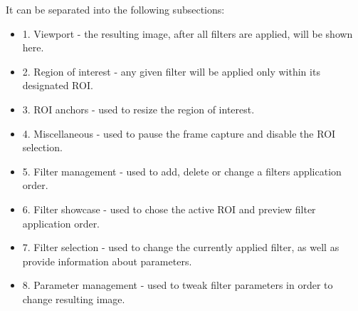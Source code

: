 It can be separated into the following subsections:
\begin{itemize}
	\item 1. Viewport - the resulting image, after all filters are applied, will be shown here.
	\item 2. Region of interest - any given filter will be applied only within its designated ROI.
	\item 3. ROI anchors - used to resize the region of interest.
	\item 4. Miscellaneous - used to pause the frame capture and disable the ROI selection.
	\item 5. Filter management - used to add, delete or change a filters application order.
	\item 6. Filter showcase - used to chose the active ROI and preview filter application order.
	\item 7. Filter selection - used to change the currently applied filter, as well as provide
	      information about parameters.
	\item 8. Parameter management - used to tweak filter parameters in order to change resulting image.
\end{itemize}






